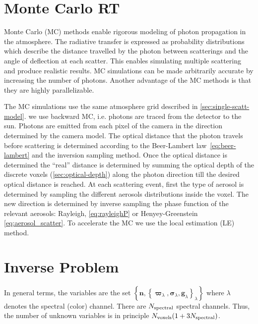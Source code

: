 \documentclass[10pt,letterpaper]{article}
\newcommand{\vect}[1]{\bm{#1}}
\begin{document}
\section{Monte Carlo RT}
\label{sec:monte-carlo-simul}

Monte Carlo (MC) methods enable rigorous modeling of photon
propagation in the atmosphere. The radiative transfer is expressed as
probability distributions which describe the distance travelled by the
photon between scatterings and the angle of deflection at each
scatter.  This enables simulating multiple scattering and produce
realistic results.  MC simulations can be made arbitrarily accurate by
increasing the number of photons.  Another advantage of the MC methods
is that they are highly parallelizable.

The MC simulations use the same atmosphere grid described in
\cref{sec:single-scatt-model}. we use backward MC, i.e. photons are
traced from the detector to the sun. Photons are emitted from each
pixel of the camera in the direction determined by the camera
model. The optical distance that the photon travels before scattering
is determined according to the Beer-Lambert law~\cref{eq:beer-lambert}
and the inversion sampling method. Once the optical distance is
determined the ``real'' distance is determined by summing the optical
depth of the discrete voxels (\cref{sec:optical-depth}) along the
photon direction till the desired optical distance is reached.  At
each scattering event, first the type of aerosol is determined by
sampling the different aerosols distributions inside the voxel. The
new direction is determined by inverse sampling the phase function of
the relevant aerosols: Rayleigh, \cref{eq:rayleighP} or
Henyey-Greenstein \cref{eq:aerosol_scatter}.  To accelerate the MC we
use the local estimation (LE) method.



\section{Inverse Problem}
\label{sec:inverse-problem}

In general terms, the variables are the set \mbox{$\left\{{\bm
      n},\left\{\vect{\varpi}_{\lambda},\vect{\sigma}_{\lambda},{\bm
        g}_{\lambda}\right\}_{\lambda}\right\}$} where $\lambda$
denotes the spectral (color) channel.  There are $N_{\rm spectral}$
spectral channels.  Thus, the number of unknown variables is in
principle \mbox{$N_{\rm voxels}(1+3N_{\rm spectral})$}.
\end{document}
